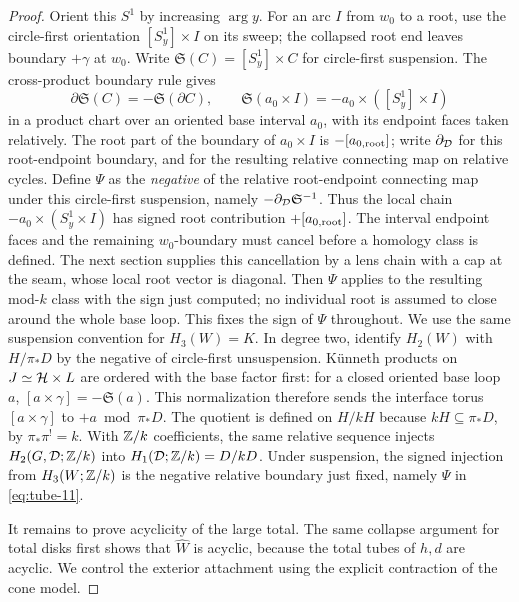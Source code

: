 \begin{proof}
Orient this \(S^1\) by increasing \(\arg y\).
For an arc \(I\) from \(w_0\) to a root, use the circle-first
orientation \([S^1_y]\times I\) on its sweep; the collapsed root
end leaves boundary \(+\gamma\) at \(w_0\).
Write \(\mathfrak S(C)=[S^1_y]\times C\) for circle-first suspension.
The cross-product boundary rule gives
\[
 \partial\mathfrak S(C)=-\mathfrak S(\partial C),\qquad
 \mathfrak S(a_0\times I)=-a_0\times([S^1_y]\times I)
\]
in a product chart over an oriented base interval \(a_0\), with
its endpoint faces taken relatively. The root part of the
boundary of \(a_0\times I\) is \(-[a_{0,\rm root}]\); write
\(\partial_{\mathcal D}\) for this root-endpoint boundary, and for the
resulting relative connecting map on relative cycles.
Define \(\Psi\) as the \emph{negative} of the relative root-endpoint
connecting map under this circle-first suspension, namely
\(-\partial_{\mathcal D}\mathfrak S^{-1}\). Thus the local chain
\(-a_0\times(S^1_y\times I)\) has signed root contribution
\(+[a_{0,\rm root}]\). The interval endpoint faces and the
remaining \(w_0\)-boundary must cancel before a homology class is
defined. The next section supplies this cancellation by a lens
chain with a cap at the seam, whose local root vector is diagonal.
Then \(\Psi\) applies to the resulting mod-\(k\) class with the
sign just computed; no individual root is assumed to close around
the whole base loop.
This fixes the sign of \(\Psi\) throughout.
We use the same suspension convention for \(H_3(W)=K\).
In degree two, identify \(H_2(W)\) with \(H/\pi_*D\) by the
negative of circle-first unsuspension. Künneth products on
\(J\simeq\mathcal H\times L\) are ordered with the base factor first:
for a closed oriented base loop \(a\),
\([a\times\gamma]=-\mathfrak S(a)\). This normalization therefore
sends the interface torus \([a\times\gamma]\) to
\(+a\bmod\pi_*D\). The quotient is defined on \(H/kH\) because
\(kH\subseteq\pi_*D\), by \(\pi_*\pi^!=k\).
With \(\mathbb Z/k\) coefficients, the same relative sequence injects
\(H_2(G,\mathcal D;\mathbb Z/k)\) into \(H_1(\mathcal D;\mathbb Z/k)=D/kD\).
Under suspension, the signed injection from \(H_3(W;\mathbb Z/k)\)
is the negative relative boundary just fixed, namely \(\Psi\)
in \eqref{eq:tube-11}.

It remains to prove acyclicity of the large total. The same collapse
argument for total disks first shows that \(\widehat W\) is acyclic,
because the total tubes of \(h,d\) are acyclic. We control the
exterior attachment using the explicit contraction of the cone model.


\end{proof}
